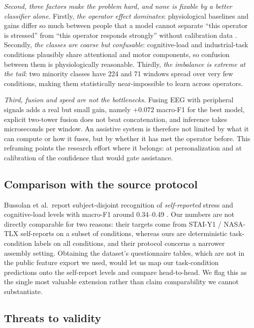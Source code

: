 \documentclass{llncs}
\begin{document}
\emph{Second, three factors make the problem hard, and none is fixable by a better
classifier alone.} Firstly, \emph{the operator effect dominates}: physiological
baselines and gains differ so much between people that a model cannot separate ``this
operator is stressed'' from ``this operator responds strongly'' without calibration
data \cite{aygun2022assistive,borghi2025operatorstress}. Secondly, \emph{the classes
are coarse but confusable}: cognitive-load and industrial-task conditions plausibly
share attentional and motor components, so confusion between them is physiologically
reasonable. Thirdly, \emph{the imbalance is extreme at the tail}: two minority
classes have 224 and 71 windows spread over very few conditions, making them
statistically near-impossible to learn across operators.

\emph{Third, fusion and speed are not the bottlenecks.} Fusing \ac{EEG} with
peripheral signals adds a real but small gain, namely $+0.072$ macro-F1 for the best
model, explicit two-tower fusion does not beat concatenation, and inference takes
microseconds per window. An assistive system is therefore not limited by what it can
compute or how it fuses, but by whether it has met the operator before. This reframing
points the research effort where it belongs: at personalization and at calibration of
the confidence that would gate assistance.

\subsection{Comparison with the source protocol}

Bussolan et al.\ report subject-disjoint recognition of \emph{self-reported} stress
and cognitive-load levels with macro-F1 around 0.34--0.49
\cite{bussolan2025multiphysiohrc,bussolan2024stressdetector}. Our numbers are not
directly comparable for two reasons: their targets come from STAI-Y1 / NASA-TLX
self-reports on a subset of conditions, whereas ours are deterministic
task-condition labels on all conditions, and their protocol concerns a narrower
assembly setting. Obtaining the dataset's questionnaire tables, which are not in the
public feature export we used, would let us map our task-condition predictions onto
the self-report levels and compare head-to-head. We flag this as the single most
valuable extension rather than claim comparability we cannot substantiate.

\subsection{Threats to validity}
\end{document}

